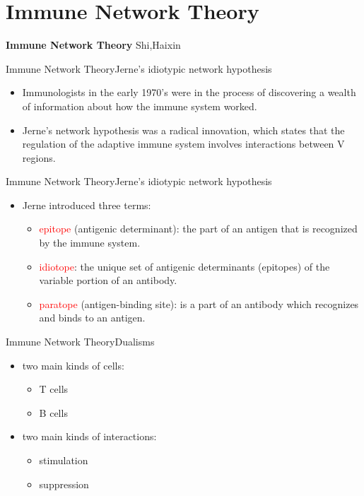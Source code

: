 \section{Immune Network Theory}

\begin{frame}
\Huge \textbf{Immune Network Theory}
\large {Shi,Haixin}
\end{frame}

\begin{frame}{Immune Network Theory}{Jerne's idiotypic network hypothesis}
  \begin{itemize}
  \item \large{
    Immunologists in the early 1970's were in the process of discovering a wealth of information about how the immune system worked.
  }
  \item \large{
    Jerne's network hypothesis was a radical innovation, which states that the regulation of the adaptive immune system involves interactions between V regions.
  }
  \end{itemize}
\end{frame}

\begin{frame}{Immune Network Theory}{Jerne's idiotypic network hypothesis}
   \begin{itemize}
   \item \large
    Jerne introduced three terms:
    \begin{itemize}
    \item
      \large{\textcolor{red}{epitope} (antigenic determinant): the part of an antigen that is recognized by the immune system.}
    \item
      \large{\textcolor{red}{idiotope}: the unique set of antigenic determinants (epitopes) of the variable portion of an antibody.}
    \item
      \large{\textcolor{red}{paratope} (antigen-binding site): is a part of an antibody which recognizes and binds to an antigen.}
    \end{itemize}
  \end{itemize}
\end{frame}

\begin{frame}{Immune Network Theory}{Dualisms}
   \begin{itemize}
   \item \large
    two main kinds of cells:
    \begin{itemize}
    \item
      \large{T cells}
    \item
      \large{B cells}
    \end{itemize}
   \item \large
    two main kinds of interactions:
    \begin{itemize}
    \item
      \large{stimulation}
    \item
      \large{suppression}
    \end{itemize}
  \end{itemize}
\end{frame}

